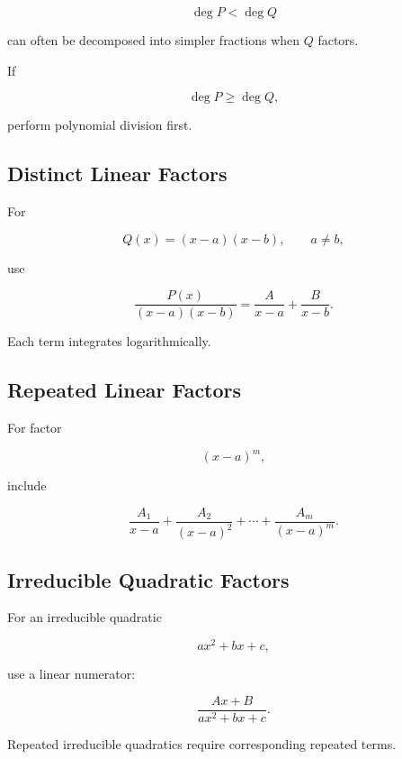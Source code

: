 \[
\deg P<\deg Q
\]

can often be decomposed into simpler fractions when \(Q\) factors.

If

\[
\deg P\geq\deg Q,
\]

perform polynomial division first.

\subsection{Distinct Linear Factors}
\label{subsec:partial-fractions-distinct-linear}

For

\[
Q(x)
=
(x-a)(x-b),
\qquad
a\neq b,
\]

use

\[
\boxed{
\frac{P(x)}{
(x-a)(x-b)
}
=
\frac{A}{x-a}
+
\frac{B}{x-b}.
}
\]

Each term integrates logarithmically.

\subsection{Repeated Linear Factors}
\label{subsec:partial-fractions-repeated-linear}

For factor

\[
(x-a)^m,
\]

include

\[
\boxed{
\frac{A_1}{x-a}
+
\frac{A_2}{(x-a)^2}
+
\cdots
+
\frac{A_m}{(x-a)^m}.
}
\]

\subsection{Irreducible Quadratic Factors}
\label{subsec:partial-fractions-irreducible-quadratic}

For an irreducible quadratic

\[
ax^2+bx+c,
\]

use a linear numerator:

\[
\boxed{
\frac{
Ax+B
}{
ax^2+bx+c
}.
}
\]

Repeated irreducible quadratics require corresponding repeated terms.

